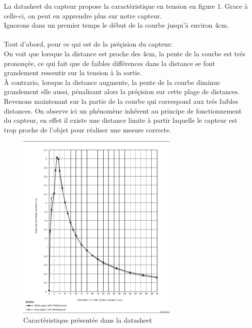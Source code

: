 \documentclass[oneside,a4paper,12pt]{article}
\begin{document}
	La datasheet du capteur propose la caractèristique en tension en figure 1. Grace à celle-ci, on peut en apprendre plus sur notre capteur.\\
	Ignorons dans un premier temps le début de la courbe jusqu'à environ 4cm.\\
	\paragraph{}
	Tout d'abord, pour ce qui est de la préçision du capteur:\\
	On voit que lorsque la distance est proche des 4cm, la pente de la courbe est trés prononçée, ce qui fait que de faibles différences dans la distance se font grandement ressentir sur la tension à la sortie.\\
	\`{A} contrario, lorsque la distance augmente, la pente de la courbe diminue grandement elle aussi, pénalisant alors la préçision sur cette plage de distances.\\
	Revenons maintenant sur la partie de la courbe qui correspond aux trés faibles distances. On observe ici un phénomène inhérent au principe de fonctionnement du capteur, en effet il existe une distance limite à partir laquelle le capteur est trop proche de l'objet pour réaliser une mesure correcte.
	
	
	\begin{figure}[h]
		\centering
		\includegraphics[width=8cm]{screenDatasheet.png}
		\caption{Caractèristique présentée dans la datasheet}
	\end{figure} 
\end{document}
